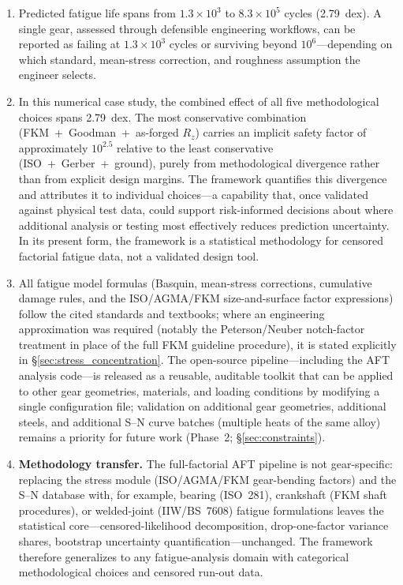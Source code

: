 \documentclass[twocolumn,12pt,a4paper]{article}
\begin{document}
\begin{enumerate}
        constant-amplitude loading; this figure must not be extrapolated
        to variable-amplitude spectra, where sequence effects and
        damage-rule differences could produce substantially larger
        divergence.
  \item Predicted fatigue life spans from $1.3\times10^3$ to
        $8.3\times10^5$ cycles (2.79~dex). A single gear, assessed
        through defensible engineering workflows, can be reported as
        failing at $1.3\times10^3$ cycles or surviving beyond $10^6$---depending on
        which standard, mean-stress correction, and roughness
        assumption the engineer selects.
  \item In this numerical case study, the combined effect of all five
        methodological choices spans 2.79~dex. The most conservative
        combination (FKM~+~Goodman~+~as-forged $R_z$) carries an
        implicit safety factor of approximately $10^{2.5}$ relative to
        the least conservative (ISO~+~Gerber~+~ground), purely from
        methodological divergence rather than from explicit design
        margins. The framework quantifies this divergence and attributes
        it to individual choices---a capability that, once validated
        against physical test data, could support risk-informed
        decisions about where additional analysis or testing most
        effectively reduces prediction uncertainty. In its present
        form, the framework is a statistical methodology for censored
        factorial fatigue data, not a validated design tool.
  \item All fatigue model formulas (Basquin, mean-stress corrections,
        cumulative damage rules, and the ISO/AGMA/FKM size-and-surface
        factor expressions) follow the cited standards and textbooks;
        where an engineering approximation was required (notably the
        Peterson/Neuber notch-factor treatment in place of the full FKM
        guideline procedure), it is stated explicitly in
        \S\ref{sec:stress_concentration}. The open-source pipeline---including
        the AFT analysis code---is released as a reusable, auditable
        toolkit that can be applied to other gear geometries, materials,
        and loading conditions by modifying a single configuration
        file; validation on additional gear geometries, additional
        steels, and additional S--N curve batches (multiple heats of
        the same alloy) remains a priority for future work (Phase~2;
        \S\ref{sec:constraints}).
  \item \textbf{Methodology transfer.} The full-factorial AFT pipeline
        is not gear-specific: replacing the stress module
        (ISO/AGMA/FKM gear-bending factors) and the S--N database
        with, for example, bearing (ISO~281), crankshaft (FKM shaft
        procedures), or welded-joint (IIW/BS~7608) fatigue
        formulations leaves the statistical core---censored-likelihood
        decomposition, drop-one-factor variance shares, bootstrap
        uncertainty quantification---unchanged. The framework
        therefore generalizes to any fatigue-analysis domain with
        categorical methodological choices and censored run-out data.


\end{enumerate}
\end{document}
